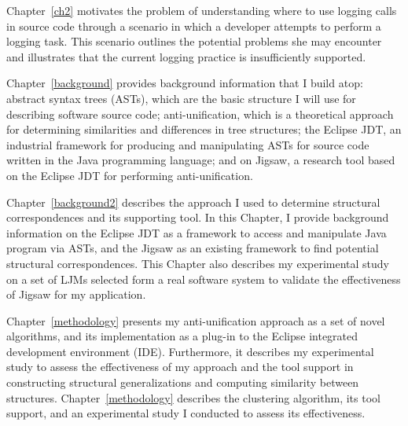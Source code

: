 Chapter~\ref{ch2} motivates the problem of understanding where to use logging calls in source code through a scenario in which a developer attempts to perform a logging task. This scenario outlines the potential problems she may encounter and illustrates that the current logging practice is insufficiently supported.

Chapter~\ref{background} provides background information that I build atop: abstract syntax trees (ASTs), which are the basic structure I will use for describing software source code; anti-unification, which is a theoretical approach for determining similarities and differences in tree structures; the Eclipse JDT, an industrial framework for producing and manipulating ASTs for source code written in the Java programming language; and on Jigsaw, a research tool based on the Eclipse JDT for performing anti-unification.

Chapter~\ref{background2} describes the approach I used to determine structural correspondences and its supporting tool. In this Chapter, I provide background information on the Eclipse JDT as a framework to access and manipulate Java program via ASTs, and the Jigsaw as an existing framework to find potential structural correspondences. This Chapter also describes my experimental study on a set of LJMs selected form a real software system to validate the effectiveness of Jigsaw for my application.

Chapter~\ref{methodology} presents my anti-unification approach as a set of novel algorithms, and its implementation as a plug-in to the Eclipse integrated development environment (IDE). Furthermore, it describes my experimental study to assess the effectiveness of my approach and the tool support in constructing structural generalizations and computing similarity between structures.
Chapter~\ref{methodology} describes the clustering algorithm, its tool support, and an experimental study I conducted to assess its effectiveness. 


